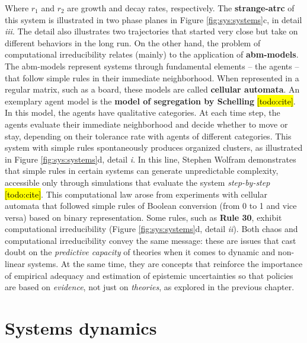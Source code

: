 \documentclass[./main_en.tex]{subfiles}
\begin{document}
Where $r_1$ and $r_2$ are growth and decay rates, respectively. The \textbf{\gls{strange-atrc}} of this \gls{system} is illustrated in two phase planes in Figure \ref{fig:sys:systems}c, in detail \textrm{\textit{iii}}. The detail also illustrates two trajectories that started very close but take on different behaviors in the long run. On the other hand, the problem of computational irreducibility relates (mainly) to the application of \textbf{\gls{abm-models}}. The \gls{abm-models} represent systems through fundamental elements – the agents – that follow simple rules in their immediate neighborhood. When represented in a regular matrix, such as a board, these models are called \textbf{cellular automata}. An exemplary agent \gls{model} is the \textbf{\gls{model} of segregation by Schelling} \hl{[todo:cite]}. In this \gls{model}, the agents have qualitative categories. At each time step, the agents evaluate their immediate neighborhood and decide whether to move or stay, depending on their tolerance rate with agents of different categories. This \gls{system} with simple rules spontaneously produces organized clusters, as illustrated in Figure \ref{fig:sys:systems}d, detail \textrm{\textit{i}}. In this line, Stephen Wolfram demonstrates that simple rules in certain systems can generate unpredictable complexity, accessible only through simulations that evaluate the \gls{system} \textit{step-by-step} \hl{[todo:cite]}. This computational law arose from experiments with cellular automata that followed simple rules of Boolean conversion (from 0 to 1 and vice versa) based on binary representation. Some rules, such as \textbf{Rule 30}, exhibit computational irreducibility (Figure \ref{fig:sys:systems}d, detail \textrm{\textit{ii}}). Both \gls{chaos} and computational irreducibility convey the same message: these are issues that cast doubt on the \textit{predictive capacity} of theories when it comes to dynamic and non-linear systems. At the same time, they are concepts that reinforce the importance of empirical adequacy and estimation of epistemic uncertainties so that policies are based on \textit{evidence}, not just on \textit{theories}, as explored in the previous chapter.


\section{Systems dynamics} \label{sec:sys:dynamics}
\end{document}
